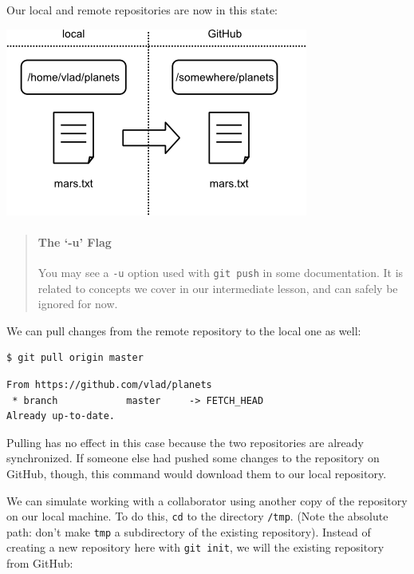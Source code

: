 \documentclass{book}
\begin{document}
Our local and remote repositories are now in this state:

\includegraphics{novice/git/img/github-repo-after-first-push.png}

\begin{quote}
\mbox{}\paragraph{The `-u' Flag}

You may see a \texttt{-u} option used with \texttt{git push} in some
documentation. It is related to concepts we cover in our intermediate
lesson, and can safely be ignored for now.
\end{quote}

We can pull changes from the remote repository to the local one as well:

\begin{verbatim}
$ git pull origin master
\end{verbatim}

\begin{verbatim}
From https://github.com/vlad/planets
 * branch            master     -> FETCH_HEAD
Already up-to-date.
\end{verbatim}

Pulling has no effect in this case because the two repositories are
already synchronized. If someone else had pushed some changes to the
repository on GitHub, though, this command would download them to our
local repository.

We can simulate working with a collaborator using another copy of the
repository on our local machine. To do this, \texttt{cd} to the
directory \texttt{/tmp}. (Note the absolute path: don't make
\texttt{tmp} a subdirectory of the existing repository). Instead of
creating a new repository here with \texttt{git init}, we will
 the existing repository from
GitHub:
\end{document}
